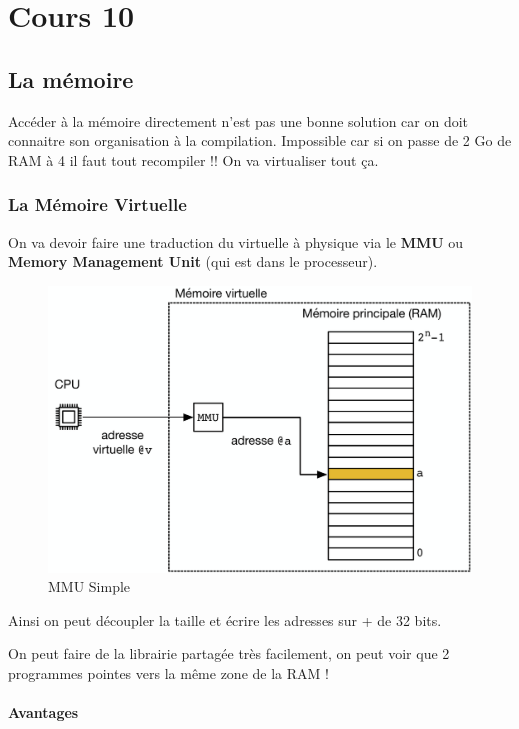 \section{Cours 10}\label{cours-10}

\subsection{La mémoire}\label{la-muxe9moire}

Accéder à la mémoire directement n'est pas une bonne solution car on
doit connaitre son organisation à la compilation. Impossible car si on
passe de 2 Go de RAM à 4 il faut tout recompiler !! On va virtualiser
tout ça.

\subsubsection{La Mémoire Virtuelle}\label{la-muxe9moire-virtuelle}

On va devoir faire une traduction du virtuelle à physique via le
\textbf{MMU} ou \textbf{Memory Management Unit} (qui est dans le
processeur).

\begin{figure}
\centering
\includegraphics{image-52.png}
\caption{MMU Simple}
\end{figure}

Ainsi on peut découpler la taille et écrire les adresses sur + de 32
bits.

On peut faire de la librairie partagée très facilement, on peut voir que
2 programmes pointes vers la même zone de la RAM !

\paragraph{Avantages}\label{avantages}


